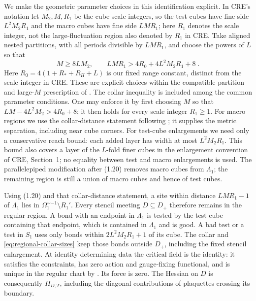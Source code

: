 \documentclass[11pt]{article}
\begin{document}
We make the geometric parameter choices in this identification explicit. In CRE's notation let $M_2,M,R_1$ be the cube-scale integers, so the test cubes have fine side $L^2M_2R_1$ and the macro cubes have fine side $LMR_1$; here $R_1$ denotes the scale integer, not the large-fluctuation region also denoted by $R_1$ in CRE. Take aligned nested partitions, with all periods divisible by $LMR_1$, and choose the powers of $L$ so that
\begin{equation}\label{eq:regional-collar-sizes}
    M\geq 8LM_2,
    \qquad LMR_1>4R_0+4L^2M_2R_1+8\;.
\end{equation}
Here $R_0=4(1+R_*+R_H+L)$ is our fixed range constant, distinct from the scale integer in CRE. These are explicit choices within the compatible-partition and large-$M$ prescription of \cite[Section~1]{BalabanCRE}. The collar inequality is included among the common parameter conditions. One may enforce it by first choosing $M$ so that $LM-4L^2M_2>4R_0+8$; it then holds for every scale integer $R_1\geq1$. For macro regions we use the collar-distance statement following \cite[(1.10)]{BalabanCRE}; it supplies the metric separation, including near cube corners. For test-cube enlargements we need only a conservative reach bound: each added layer has width at most $L^2M_2R_1$. This bound also covers a layer of the $L$-fold finer cubes in the enlargement convention of CRE, Section~1; no equality between test and macro enlargements is used. The parallelepiped modification after (1.20) removes macro cubes from $\Lambda_1$; the remaining region is still a union of macro cubes and hence of test cubes.

Using (1.20) and that collar-distance statement, a site within distance $LMR_1-1$ of $\Lambda_1$ lies in $\Omega_1^{\sim-1}\setminus R_1'$. Every stencil meeting $D\subseteq D_+$ therefore remains in the regular region. A bond with an endpoint in $\Lambda_1$ is tested by the test cube containing that endpoint, which is contained in $\Lambda_1$ and is good. A bad test or a test in $S_1$ uses only bonds within $2L^2M_2R_1+1$ of its cube. The collar and \eqref{eq:regional-collar-sizes} keep those bonds outside $D_+$, including the fixed stencil enlargement. At identity determining data the critical field is the identity: it satisfies the constraints, has zero action and gauge-fixing functional, and is unique in the regular chart by \cite[(1.12)]{BalabanCRE}. Its force is zero. The Hessian on $D$ is consequently $H_{D,T}$, including the diagonal contributions of plaquettes crossing its boundary.
\end{document}
